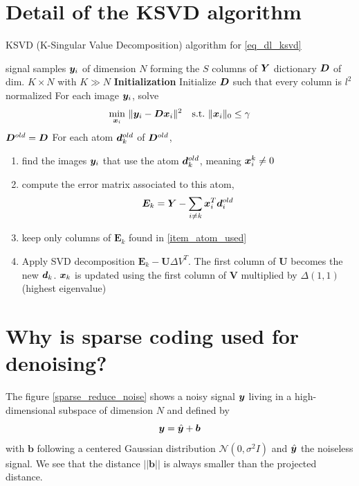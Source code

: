 \section{Detail of the \ac{KSVD} algorithm} \label{sec_ksvd_detail}
\begin{algorithm}
    \caption{\ac{KSVD} (K-Singular Value Decomposition) algorithm for \eqref{eq_dl_ksvd}} \label{alg_ksvd}
  \begin{algorithmic}[1]
    \Input signal samples $\bm{y}_i$ of dimension $N$ forming the $S$ columns of $\bm{Y}$
    \Output dictionary $\bm{D}$ of dim. $K \times N$ with $K \gg N$
    \State \textbf{Initialization} Initialize $\bm{D}$ such that every column is $l^2$ normalized
	\State For each image $\bm{y}_i$, solve  \label{alg_ksvd_sparse_coding}
		\begin{align*}
			\quad \min_{\bm{x}_i}~ & \lVert \bm{y}_i-\bm{D}\bm{x}_i\rVert^2 \quad \text{s.t.}~ \lVert \bm{x}_i \rVert_0 \le \gamma
		\end{align*}
	\State $\bm{D}^{old} = \bm{D}$
	\State For each atom $\bm{d}_k^{old}$ of $\bm{D}^{old}$, \label{alg_ksvd_dict_update}
	\begin{enumerate}[leftmargin=15mm,label=(\alph*)]
		\item find the images $\bm{y}_i$ that use the atom $\bm{d}_k^{old}$, meaning $\bm{x}_i^k \ne 0$ \label{item_atom_used}
		\item compute the error matrix associated to this atom,
		\begin{align*}
			\bm{E}_k = \bm{Y}-\sum_{i\ne k} \bm{x}_i^T\bm{d}_i^{old}
		\end{align*}
		\item keep only columns of $\bm{E}_k$ found in \cref{item_atom_used}
		\item Apply SVD decomposition $\bm{E}_k - \bm{U} \Delta V^T$. The first column of $\bm{U}$ becomes the new $\bm{d}_k$. $\bm{x}_k$ is updated using the first column of $\bm{V}$ multiplied by $\Delta(1,1)$ (highest eigenvalue)
	\end{enumerate}
    \EndWhile
  \end{algorithmic}
\end{algorithm}

\clearpage

\section{Why is sparse coding used for denoising?}

The figure \ref{sparse_reduce_noise} shows a noisy signal $\bm{y}$ living in a high-dimensional subspace of dimension $N$ and defined by
$$\bm{y}=\hat{\bm{y}} + \bm{b}$$
with $\bm{b}$ following a centered Gaussian distribution $\mathcal{N}(0,\sigma^2I)$ and $\hat{\bm{y}}$ the noiseless signal. We see that the distance $||\bm{b}||$ is always smaller than the projected distance.

